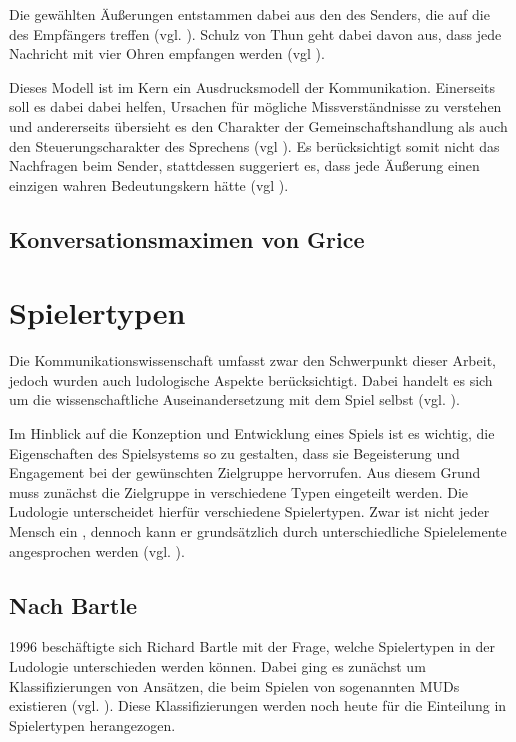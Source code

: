 Die gewählten Äußerungen entstammen dabei aus den  des Senders, die auf die  des Empfängers treffen (vgl. \cite{noauthor_kommunikationsquadrat_nodate}). Schulz von Thun geht dabei davon aus, dass jede Nachricht mit vier Ohren empfangen werden (vgl \cite[S. 23]{becker_praxishandbuch_2018}). 

Dieses Modell ist im Kern ein Ausdrucksmodell der Kommunikation. Einerseits soll es dabei dabei helfen, Ursachen für mögliche Missverständnisse zu verstehen und andererseits übersieht es den Charakter der Gemeinschaftshandlung als auch den Steuerungscharakter des Sprechens (vgl \cite[S. 23]{becker_praxishandbuch_2018}). Es berücksichtigt somit nicht das Nachfragen beim Sender, stattdessen suggeriert es, dass jede Äußerung einen einzigen wahren Bedeutungskern hätte (vgl \cite[S. 23]{becker_praxishandbuch_2018}). 

\subsection{Konversationsmaximen von Grice}

\section{Spielertypen}
Die Kommunikationswissenschaft umfasst zwar den Schwerpunkt dieser Arbeit, jedoch wurden auch ludologische Aspekte berücksichtigt. Dabei handelt es sich um die wissenschaftliche Auseinandersetzung mit dem Spiel selbst (vgl. \cite{ludologie_spielforschung_nodate}). 

Im Hinblick auf die Konzeption und Entwicklung eines Spiels ist es wichtig, die Eigenschaften des Spielsystems so zu gestalten, dass sie Begeisterung und Engagement bei der gewünschten Zielgruppe hervorrufen. Aus diesem Grund muss zunächst die Zielgruppe in verschiedene Typen eingeteilt werden. Die Ludologie unterscheidet hierfür verschiedene Spielertypen. Zwar ist nicht jeder Mensch ein , dennoch kann er grundsätzlich durch unterschiedliche Spielelemente angesprochen werden (vgl. \cite{ludologie_spielertypen_nodate}).

\subsection{Nach Bartle}
1996 beschäftigte sich Richard Bartle mit der Frage, welche Spielertypen in der Ludologie unterschieden werden können. Dabei ging es zunächst um Klassifizierungen von Ansätzen, die beim Spielen von sogenannten \ac{MUD}s existieren (vgl. \cite{bartle_hearts_1996}). Diese Klassifizierungen werden noch heute für die Einteilung in Spielertypen herangezogen.

